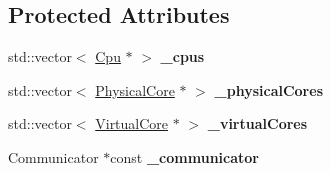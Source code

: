 \subsection*{Protected Attributes}
\begin{DoxyCompactItemize}
\item 
\hypertarget{classmammut_1_1topology_1_1Topology_a6944acd53deb410d403e65b4d343fdad}{std\-::vector$<$ \hyperlink{classmammut_1_1topology_1_1Cpu}{Cpu} $\ast$ $>$ {\bfseries \-\_\-cpus}}\label{classmammut_1_1topology_1_1Topology_a6944acd53deb410d403e65b4d343fdad}

\item 
\hypertarget{classmammut_1_1topology_1_1Topology_a09a00ae70b3b7ee6b158d4acf4a14ee0}{std\-::vector$<$ \hyperlink{classmammut_1_1topology_1_1PhysicalCore}{Physical\-Core} $\ast$ $>$ {\bfseries \-\_\-physical\-Cores}}\label{classmammut_1_1topology_1_1Topology_a09a00ae70b3b7ee6b158d4acf4a14ee0}

\item 
\hypertarget{classmammut_1_1topology_1_1Topology_a25ec14bb56248233c846d8ee59bd008f}{std\-::vector$<$ \hyperlink{classmammut_1_1topology_1_1VirtualCore}{Virtual\-Core} $\ast$ $>$ {\bfseries \-\_\-virtual\-Cores}}\label{classmammut_1_1topology_1_1Topology_a25ec14bb56248233c846d8ee59bd008f}

\item 
\hypertarget{classmammut_1_1topology_1_1Topology_a92e6dced04ccefa71d458c2425850bd6}{Communicator $\ast$const {\bfseries \-\_\-communicator}}\label{classmammut_1_1topology_1_1Topology_a92e6dced04ccefa71d458c2425850bd6}

\end{DoxyCompactItemize}



